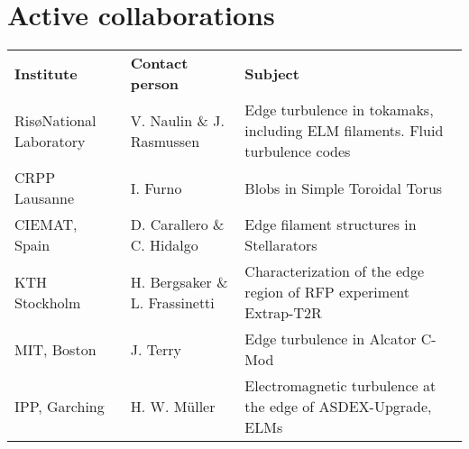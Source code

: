 \section{Active collaborations}
\begin{longtable}{l p{5cm} p{9cm}}
\textbf{Institute} & \textbf{Contact person} & \textbf{Subject} \\
Ris\o National Laboratory & V. Naulin \& J. Rasmussen & Edge
turbulence in tokamaks, including ELM filaments. Fluid turbulence codes  \\
CRPP Lausanne & I. Furno & Blobs in Simple Toroidal
Torus \\
CIEMAT, Spain & D. Carallero \& C. Hidalgo & Edge filament structures
in Stellarators \\
KTH Stockholm & H. Bergsaker \& L. Frassinetti & Characterization of
the edge region of RFP experiment Extrap-T2R \\
MIT, Boston & J. Terry & Edge turbulence in Alcator C-Mod \\
IPP, Garching & H. W. M\"uller & Electromagnetic turbulence at the
edge of ASDEX-Upgrade, ELMs

\end{longtable}
